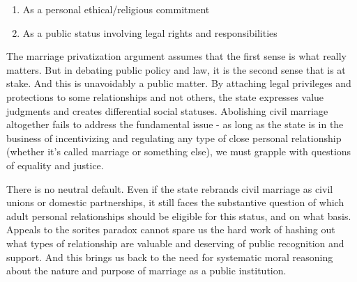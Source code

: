 \documentclass{article}
\begin{document}
\begin{enumerate}
\item {As a personal ethical/religious commitment}
\item {As a public status involving legal rights and responsibilities}
\end{enumerate}

The marriage privatization argument assumes that the first sense is what really matters. But in debating public policy and law, it is the second sense that is at stake. And this is unavoidably a public matter. By attaching legal privileges and protections to some relationships and not others, the state expresses value judgments and creates differential social statuses. Abolishing civil marriage altogether fails to address the fundamental issue - as long as the state is in the business of incentivizing and regulating any type of close personal relationship (whether it's called marriage or something else), we must grapple with questions of equality and justice.

There is no neutral default. Even if the state rebrands civil marriage as civil unions or domestic partnerships, it still faces the substantive question of which adult personal relationships should be eligible for this status, and on what basis. Appeals to the sorites paradox cannot spare us the hard work of hashing out what types of relationship are valuable and deserving of public recognition and support. And this brings us back to the need for systematic moral reasoning about the nature and purpose of marriage as a public institution.

\printbibliography{}
\end{document}
